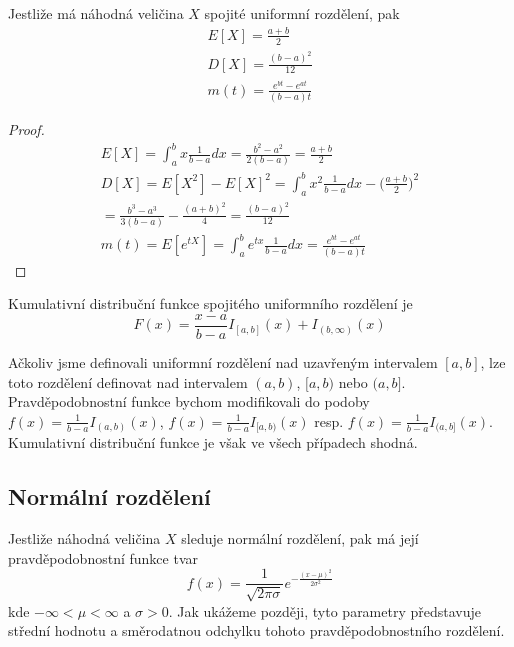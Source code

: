 \begin{theorem}
Jestliže má náhodná veličina $X$ spojité uniformní rozdělení, pak
\begin{gather*}
E[X] = \frac{a + b}{2}\\
D[X] = \frac{(b - a)^2}{12}\\
m(t) = \frac{e^{bt} - e^{at}}{(b - a)t}
\end{gather*}
\end{theorem}

\begin{proof}
\begin{gather*}
E[X] = \int_a^b x \frac{1}{b - a}dx = \frac{b^2 - a^2}{2(b - a)} = \frac{a + b}{2}\\
D[X] = E[X^2] - E[X]^2 = \int_a^b x^2 \frac{1}{b - a}dx - \Big(\frac{a + b}{2}\Big)^2\\
= \frac{b^3 - a^3}{3(b - a)} - \frac{(a + b)^2}{4} = \frac{(b - a)^2}{12}\\
m(t) = E[e^{tX}] = \int_a^b e^{tx} \frac{1}{b - a}dx = \frac{e^{bt} - e^{at}}{(b - a)t}
\end{gather*}
\end{proof}

\begin{theorem}
Kumulativní distribuční funkce spojitého uniformního rozdělení je
\begin{equation*}
F(x) = \frac{x - a}{b - a}I_{[a,b]}(x) + I_{(b, \infty)}(x)
\end{equation*}
\end{theorem}

Ačkoliv jsme definovali uniformní rozdělení nad uzavřeným intervalem $[a, b]$, lze toto rozdělení definovat nad intervalem $(a, b)$, $[a, b)$ nebo $(a,b]$. Pravděpodobnostní funkce bychom modifikovali do podoby $f(x) = \frac{1}{b - a}I_{(a, b)}(x)$, $f(x) = \frac{1}{b - a}I_{[a, b)}(x)$ resp. $f(x) = \frac{1}{b - a}I_{(a, b]}(x)$. Kumulativní distribuční funkce je však ve všech případech shodná.

\subsection{Normální rozdělení}

\begin{definition}
Jestliže náhodná veličina $X$ sleduje normální rozdělení, pak má její pravděpodobnostní funkce tvar
\begin{equation*}
f(x) = \frac{1}{\sqrt{2 \pi \sigma}} e^{-\frac{(x - \mu)^2}{2 \sigma^2}}
\end{equation*}
kde $-\infty < \mu < \infty$ a $\sigma > 0$. Jak ukážeme později, tyto parametry představuje střední hodnotu a směrodatnou odchylku tohoto pravděpodobnostního rozdělení.
\end{definition}

